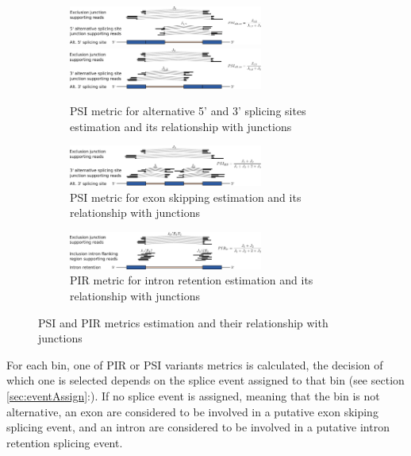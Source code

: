 \documentclass{article}
\newcommand{\secref}[1]{\ref{#1}:\nameref{#1}}
\begin{document}
\begin{figure}[ht!]
    \begin{subfigure}[t]{1\textwidth}
    \centering
      \includegraphics[width=0.7\textwidth]{images/psi5ss.pdf}
      \includegraphics[width=0.7\textwidth]{images/psi3ss.pdf}      
      \caption{PSI metric for alternative 5' and 3' splicing sites estimation and its relationship with junctions}
    \end{subfigure}
    \begin{subfigure}[t]{1\textwidth}
    \centering
      \includegraphics[width=0.7\textwidth]{images/psies.pdf}
      \caption{PSI metric for exon skipping estimation and its relationship with
      junctions}
    \end{subfigure}
    \begin{subfigure}[t]{1\textwidth}
      \centering
      \includegraphics[width=0.7\textwidth]{images/pir.pdf}
      \caption{PIR metric for intron retention estimation and its relationship
      with junctions}
    \end{subfigure}    
    \caption{PSI and PIR metrics estimation and their relationship with
    junctions}
    \label{fig:pirEq}
\end{figure}

For each bin, one of PIR or PSI variants metrics is calculated, the decision of
which one is selected depends on the splice event assigned to that bin (see
section \secref{sec:eventAssign}). If no splice event is assigned, meaning that
the bin is not alternative, an exon are considered to be involved in
a putative exon skiping splicing event, and an intron are considered to be
involved in a putative intron retention splicing event. 
\end{document}
